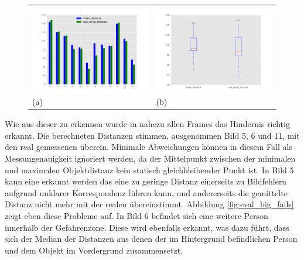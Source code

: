 		    
	\begin{figure}[h]
		\centering
		\begin{tabular}{m{7.0cm} m{7.0cm}}
		\includegraphics[width=7cm]{img/evaluation/big_bar}
		\centering \small (a)
		&
		\includegraphics[width=7cm]{img/evaluation/big_box}
		\centering \small (b)
		\end{tabular}
		\caption{}
	    \label{fig:eval_big}
	\end{figure}
	
	\noindent
	Wie aus dieser zu erkennen wurde in nahezu allen Frames das Hindernis richtig erkannt. Die berechneten Distanzen stimmen, ausgenommen Bild 5, 6 und 11, mit den real gemessenen überein. Minimale Abweichungen können in diesem Fall als Messungenauigkeit ignoriert werden, da der Mittelpunkt zwischen der minimalen und maximalen Objektdistanz kein statisch gleichbleibender Punkt ist. In Bild 5 kann eine erkannt werden das eine zu geringe Distanz einerseits zu Bildfehlern aufgrund unklarer Korrespondenz führen kann, und andererseits die gemittelte Distanz nicht mehr mit der realen übereinstimmt. Abbildung \ref{fig:eval_big_fails} zeigt eben diese Probleme auf. In Bild 6 befindet sich eine weitere Person innerhalb der Gefahrenzone. Diese wird ebenfalls erkannt, was dazu führt, dass sich der Median der Distanzen aus denen der im Hintergrund befindlichen Person und dem Objekt im Vordergrund zusammensetzt.
	
